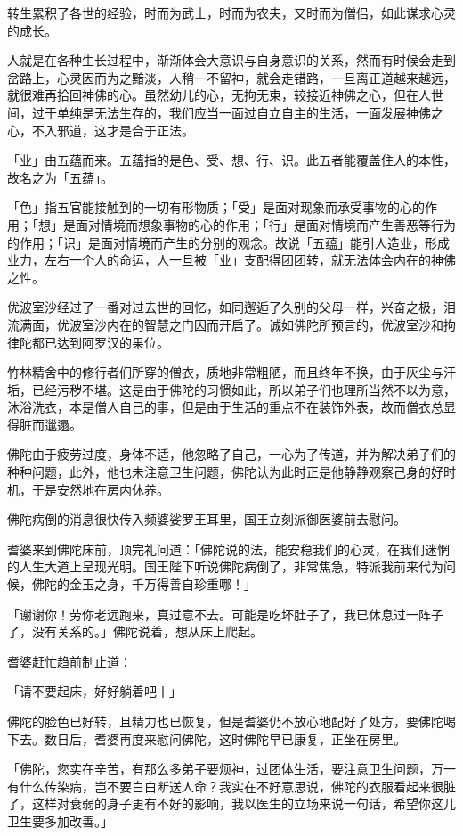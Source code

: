 \documentclass[twoside,openany]{book}
\begin{document}
转生累积了各世的经验，时而为武士，时而为农夫，又时而为僧侣，如此谋求心灵的成长。

人就是在各种生长过程中，渐渐体会大意识与自身意识的关系，然而有时候会走到岔路上，心灵因而为之黯淡，人稍一不留神，就会走错路，一旦离正道越来越远，就很难再拾回神佛的心。虽然幼儿的心，无拘无束，较接近神佛之心，但在人世间，过于单纯是无法生存的，我们应当一面过自立自主的生活，一面发展神佛之心，不入邪道，这才是合于正法。

「业」由五蕴而来。五蕴指的是色、受、想、行、识。此五者能覆盖住人的本性，故名之为「五蕴」。

「色」指五官能接触到的一切有形物质；「受」是面对现象而承受事物的心的作用；「想」是面对情境而想象事物的心的作用；「行」是面对情境而产生善恶等行为的作用；「识」是面对情境而产生的分别的观念。故说「五蕴」能引人造业，形成业力，左右一个人的命运，人一旦被「业」支配得团团转，就无法体会内在的神佛之性。

优波室沙经过了一番对过去世的回忆，如同邂逅了久别的父母一样，兴奋之极，泪流满面，优波室沙内在的智慧之门因而开启了。诚如佛陀所预言的，优波室沙和拘律陀都已达到阿罗汉的果位。

竹林精舍中的修行者们所穿的僧衣，质地非常粗陋，而且终年不换，由于灰尘与汗垢，已经污秽不堪。这是由于佛陀的习惯如此，所以弟子们也理所当然不以为意，沐浴洗衣，本是僧人自己的事，但是由于生活的重点不在装饰外表，故而僧衣总显得脏而邋遢。

佛陀由于疲劳过度，身体不适，他忽略了自己，一心为了传道，并为解决弟子们的种种问题，此外，他也未注意卫生问题，佛陀认为此时正是他静静观察己身的好时机，于是安然地在房内休养。

佛陀病倒的消息很快传入频婆娑罗王耳里，国王立刻派御医婆前去慰问。

耆婆来到佛陀床前，顶完礼问道：「佛陀说的法，能安稳我们的心灵，在我们迷惘的人生大道上呈现光明。国王陛下听说佛陀病倒了，非常焦急，特派我前来代为问候，佛陀的金玉之身，千万得善自珍重哪！」

「谢谢你！劳你老远跑来，真过意不去。可能是吃坏肚子了，我已休息过一阵子了，没有关系的。」佛陀说着，想从床上爬起。

耆婆赶忙趋前制止道：

「请不要起床，好好躺着吧丨」

佛陀的脸色已好转，且精力也已恢复，但是耆婆仍不放心地配好了处方，要佛陀喝下去。数日后，耆婆再度来慰问佛陀，这时佛陀早已康复，正坐在房里。

「佛陀，您实在辛苦，有那么多弟子要烦神，过团体生活，要注意卫生问题，万一有什么传染病，岂不要白白断送人命？我实在不好意思说，佛陀的衣服看起来很脏了，这样对衰弱的身子更有不好的影响，我以医生的立场来说一句话，希望你这儿卫生要多加改善。」
\end{document}
